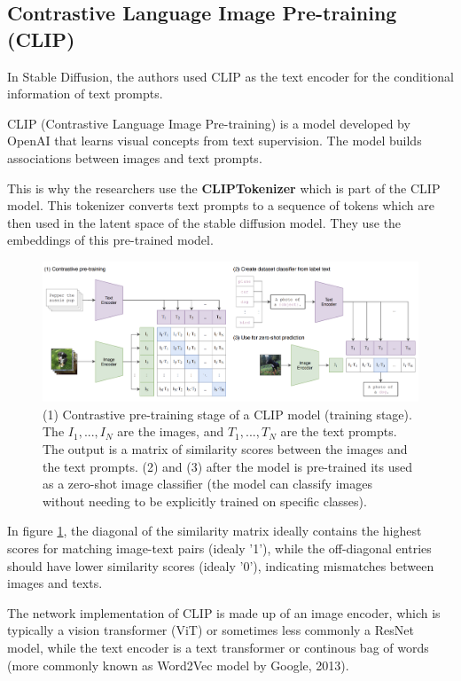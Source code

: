 \subsection{Contrastive Language Image Pre-training (CLIP)}

\label{subsec:clip}

In Stable Diffusion, the authors used CLIP as the text encoder for the conditional information of text prompts.

CLIP (Contrastive Language Image Pre-training) \cite{openai_clip} is a model developed by OpenAI that learns visual concepts from text supervision. The model builds associations between images and text prompts. 

This is why the researchers use the \textbf{CLIPTokenizer} which is part of the CLIP model. This tokenizer converts text prompts to a sequence of tokens which are then used in the latent space of the stable diffusion model. They use the embeddings of this pre-trained model.

\begin{figure}
    \centering
    \includegraphics[width=1\textwidth]{images/diffusion_models/stable_diffusion/clip.png}
    \caption{(1) Contrastive pre-training stage of a CLIP model \cite{openai_clip} (training stage). The $I_1, ..., I_N$ are the images, and $T_1, ..., T_N$ are the text prompts. The output is a matrix of similarity scores between the images and the text prompts. (2) and (3) after the model is pre-trained its used as a zero-shot image classifier (the model can classify images without needing to be explicitly trained on specific classes).}
    \label{fig:openai_clip}
\end{figure}

In figure \ref{fig:openai_clip}, the diagonal of the similarity matrix ideally contains the highest scores for matching image-text pairs (idealy '1'), while the off-diagonal entries should have lower similarity scores (idealy '0'), indicating mismatches between images and texts.

The network implementation of CLIP is made up of an image encoder, which is typically a vision transformer (ViT) \cite{vision_transformer} or sometimes less commonly a ResNet \cite{resnet} model, while the text encoder is a text transformer \cite{transformer} or continous bag of words \cite{cbow_word2vec} (more commonly known as Word2Vec model by Google, 2013).

